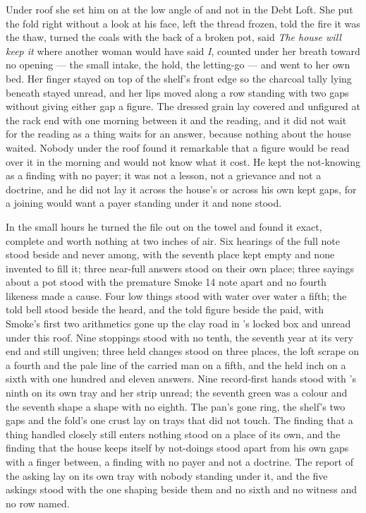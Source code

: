 Under  roof she set him on  at the low angle of  and not in the Debt Loft. She put the fold right without a look at his face, left the thread frozen, told the fire it was the thaw, turned the coals with the back of a broken pot, said \emph{The house will keep it} where another woman would have said \emph{I}, counted under her breath toward no opening --- the small intake, the hold, the letting-go --- and went to her own bed. Her finger stayed on top of the shelf's front edge so the charcoal tally lying beneath stayed unread, and her lips moved along a row standing with two gaps without giving either gap a figure. The dressed grain lay covered and unfigured at the rack end with one morning between it and the reading, and it did not wait for the reading as a thing waits for an answer, because nothing about the house waited. Nobody under the roof found it remarkable that a figure would be read over it in the morning and would not know what it cost. He kept the not-knowing as a finding with no payer; it was not a lesson, not a grievance and not a doctrine, and he did not lay it across the house's  or across his own kept gaps, for a joining would want a payer standing under it and none stood.

In the small hours he turned the file out on the towel and found it exact, complete and worth nothing at two inches of air. Six hearings of the full note stood beside and never among, with the seventh place kept empty and none invented to fill it; three near-full answers stood on their own place; three sayings about a pot stood with the premature Smoke 14 note apart and no fourth likeness made a cause. Four low things stood with water over water a fifth; the told bell stood beside the heard, and the told figure beside the paid, with Smoke's first two arithmetics gone up the clay road in 's locked box and unread under this roof. Nine stoppings stood with no tenth, the seventh year at its very end and still ungiven; three held changes stood on three places, the loft scrape on a fourth and the pale line of the carried man on a fifth, and the held inch on a sixth with one hundred and eleven answers. Nine record-first hands stood with 's ninth on its own tray and her strip unread; the seventh green was a colour and the seventh shape a shape with no eighth. The pan's gone ring, the shelf's two gaps and the fold's one crust lay on trays that did not touch. The finding that a thing handled closely still enters nothing stood on a place of its own, and the finding that the house keeps itself by not-doings stood apart from his own gaps with a finger between, a finding with no payer and not a doctrine. The report of the asking lay on its own tray with nobody standing under it, and the five askings stood with the one shaping beside them and no sixth and no witness and no row named.

